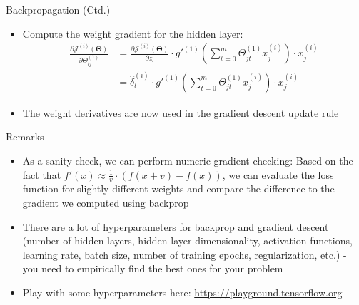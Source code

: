 \begin{frame}{Backpropagation (Ctd.)}{}\important
	\begin{itemize}
		\item Compute the weight gradient for the hidden layer:
		\begin{align*}
			\frac{\partial \mathcal{J}^{(i)}(\bm{\Theta})}{\partial \Theta_{lj}^{(1)}}
				&= \frac{\partial \mathcal{J}^{(i)}(\bm{\Theta})}{\partial z_l} \cdot g'^{(1)} \left( \sum_{t=0}^m \Theta_{jt}^{(1)} x_j^{(i)} \right) \cdot x_j^{(i)} \\
				&= \widehat{\delta}_l^{(i)} \cdot g'^{(1)} \left( \sum_{t=0}^m \Theta_{jt}^{(1)} x_j^{(i)} \right) \cdot x_j^{(i)}
		\end{align*}
		\item The weight derivatives are now used in the gradient descent update rule
	\end{itemize}
\end{frame}



\begin{frame}{Remarks}{}
	\begin{itemize}
		\item As a sanity check, we can perform numeric gradient checking: Based on the fact that $f'(x) \approx \frac{1}{v} \cdot (f(x + v) - f(x))$, we can evaluate the loss function for slightly different weights and compare the difference to the gradient we computed using backprop
		\item There are a lot of hyperparameters for backprop and gradient descent (number of hidden layers, hidden layer dimensionality, activation functions, learning rate, batch size, number of training epochs, regularization, etc.) - you need to empirically find the best ones for your problem
		\item Play with some hyperparameters here: \url{https://playground.tensorflow.org}
	\end{itemize}
\end{frame}

